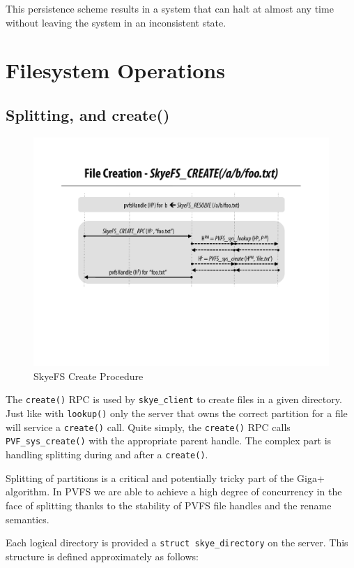 \documentclass[letterpaper]{article}
\newcommand{\code}[1]{\texttt{#1}}
\begin{document}
This persistence scheme results in a system that can halt at almost any time
without leaving the system in an inconsistent state.

\section{Filesystem Operations}
\subsection{Splitting, and create()}
\begin{figure}
\begin{center}
\includegraphics[scale=0.4]{figure-create}
\end{center}
\caption{SkyeFS Create Procedure}
\end{figure}
The \code{create()} RPC is used by \code{skye\_\-client} to create files in a given
directory.  Just like with \code{lookup()} only the server that owns the correct
partition for a file will service a \code{create()} call.  Quite simply, the
\code{create()} RPC calls \code{PVF\_\-sys\_\-create()} with the appropriate
parent handle.  The complex part is handling splitting during and after a
\code{create()}.

Splitting of partitions is a critical and potentially tricky part of the Giga+
algorithm.  In PVFS we are able to achieve a high degree of concurrency in the
face of splitting thanks to the stability of PVFS file handles and the rename
semantics.

Each logical directory is provided a \code{struct skye\_\-directory} on the server.  This
structure is defined approximately as follows:
\end{document}
